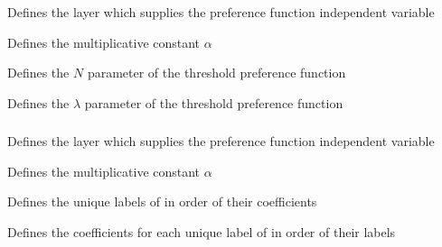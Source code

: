 \subsubsection[Threshold]{}

 {Defines the layer which supplies the preference function independent variable}

 {Defines the multiplicative constant $\alpha$}

 {Defines the $N$ parameter of the threshold preference function}

 {Defines the $\lambda$ parameter of the threshold preference function}

\subsubsection[Categorical]{}

 {Defines the layer which supplies the preference function independent variable}

 {Defines the multiplicative constant $\alpha$}

 {Defines the unique labels of  in order of their coefficients}

 {Defines the coefficients for each unique label of  in order of their labels}

\subsubsection[Monotonic categorical]{}


